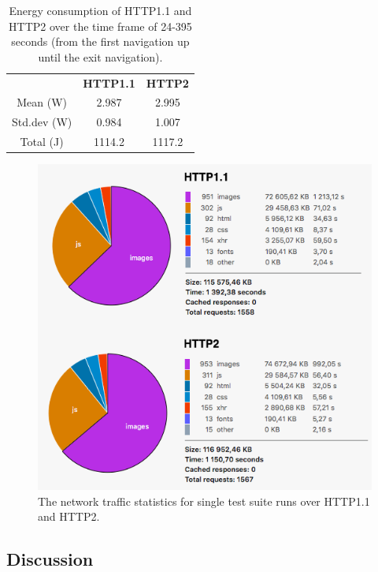 \documentclass{article}
\begin{document}
\begin{table}[h!]
    \centering
    \caption{Energy consumption of HTTP1.1 and HTTP2 over the time frame of 24-395 seconds (from the first navigation up until the exit navigation).}
    \label{table:energy_consumption}
    \begin{tabular}{c|c|c}
        & \textbf{HTTP1.1} & \textbf{HTTP2}  \\
        Mean (W)   & 2.987 & 2.995 \\
        Std.dev (W) & 0.984 & 1.007 \\
        Total (J)  & 1114.2 & 1117.2 \\
    \end{tabular}
\end{table}

\begin{figure}[h!]
\centering
\includegraphics[width=\linewidth]{images/http2_consumes.png}
\caption{The network traffic statistics for single test suite runs over HTTP1.1 and HTTP2.}
\label{fig:http2_network_traffic}
\end{figure}

\clearpage

\subsection{Discussion}
\label{chapter:discussion}
\end{document}
